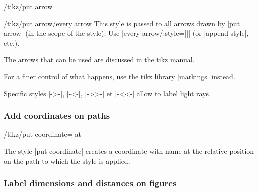 \documentclass[a4paper]{ltxdoc}
\begin{document}
\begin{key}{/tikz/put arrow}
\begin{stylekey}{/tikz/put arrow/every arrow}
  This style is passed to all arrows drawn by |put arrow| (in the scope of the style).
  Use |every arrow/.style={||}| (or |append style|, etc.).
\end{stylekey}

\begin{codeexample}[width=3cm]
\end{codeexample}


The arrows that can be used are discussed in the tikz manual.

For a finer control of what happens, use the tikz library |markings| instead. 

Specific styles |->-|, |-<-|, |->>-| et |-<<-| allow to label light rays.
\end{key}

\subsubsection{Add coordinates on paths}

\begin{key}{/tikz/put coordinate= at }

The style |put coordinate| creates a coordinate with name 
at the relative position  on the path to which the style is applied.

\begin{codeexample}[width=6cm]
\end{codeexample}

\end{key}

\subsubsection{Label dimensions and distances on figures}
\end{document}
